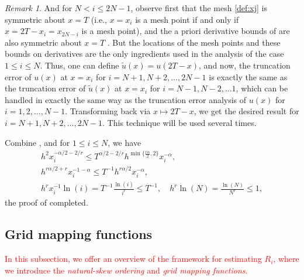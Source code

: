 \documentclass{amsart}
\theoremstyle{definition}
\theoremstyle{remark}
\newtheorem{remark}[theorem]{Remark}
\numberwithin{equation}{section}
\begin{document}
\begin{remark} \label{rmk:symm}
And for \(N<i\le 2N-1\), observe first that the mesh \eqref{def:xj} is symmetric about $x = T$ (i.e., $x = x_i$ is a mesh point if and only if $x = 2T - x_i = x_{2N-i}$ is a mesh point), and the a priori derivative bounds of  are also symmetric about $x = T$ . 
But the locations of the mesh points and these bounds on derivatives
are the only ingredients used in the analysis of the case $1\le i \le N$. Thus, one can define $\tilde{u}(x) = u(2T - x)$, and now, the truncation error of $u(x)$ at $x = x_i$ for $i = N + 1, N + 2, . . . , 2N - 1$ is exactly the same as the truncation error of $\tilde{u}(x)$ at
$x = x_i$ for $i = N -1, N -2, . . . 1$, which can be handled in exactly the same way as the truncation error analysis of $u(x)$ for $i = 1, 2, . . . , N -1$. Transforming back via $x \mapsto 2 T - x$, we get the desired result for $i = N + 1, N + 2, . . . , 2N - 1$.
This technique will be used several times.
\end{remark}

Combine , and for \(1\le i\le N\), we have
\begin{gather*}
  h^2 x_i^{-\alpha/2-2/r} \le T^{\alpha/2-2/r} h^{\min\{\frac{r\alpha}{2}, 2\}} x_i^{-\alpha} ,\\
  h^{r\alpha/2+r} x_i^{-1-\alpha} \le T^{-1} h^{r\alpha/2} x_i^{-\alpha}, \\
  h^r x_i^{-1} \ln(i) = T^{-1} \frac{\ln(i)}{i^r} \le T^{-1}, 
  \quad h^r \ln(N) = \frac{\ln(N)}{N^r} \le 1,
\end{gather*}
the proof of  completed.



\subsection{Grid mapping functions}
\label{subsec:mesh-transport-functions}

\textcolor{red}{
In this subsection, we offer an overview of the framework for estimating $R_i$, where we introduce the {\em natural-skew ordering} and {\em grid mapping functions}.
}
\end{document}

